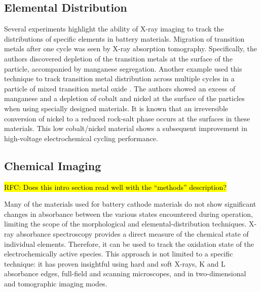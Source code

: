 \documentclass[journal=cmatex,manuscript=perspective]{achemso}
\begin{document}
\subsection{Elemental Distribution}
Several experiments highlight the ability of X-ray imaging to track
the distributions of specific elements in battery materials. Migration
of transition metals after one cycle was seen by X-ray absorption
tomography\cite{yang2014-2}. Specifically, the authors discovered
depletion of the transition metals at the surface of the particle,
accompanied by manganese segregation. Another example used this
technique to track transition metal distribution across multiple
cycles in a particle of mixed transition metal oxide
\cite{lin2016}. The authors showed
an excess of manganese and a depletion of cobalt and nickel at the
surface of the particles when using specially designed materials. It
is known that an irreversible conversion of nickel to a reduced
rock-salt phase occurs at the surfaces in these materials. This low
cobalt/nickel material shows a subsequent improvement in high-voltage
electrochemical cycling performance.

\subsection{Chemical Imaging}

\hl{RFC: Does this intro section read well with the ``methods'' description?}

Many of the materials used for battery cathode materials do not show
significant changes in absorbance between the various states
encountered during operation, limiting the scope of the morphological
and elemental-distribution techniques. X-ray absorbance spectroscopy
provides a direct measure of the chemical state of individual
elements. Therefore, it can be used to track the oxidation state of
the electrochemically active species. This approach is not limited to
a specific technique: it has proven insightful using hard and soft
X-rays, K and L absorbance edges, full-field and scanning microscopes,
and in two-dimensional and tomographic imaging modes.
\end{document}
